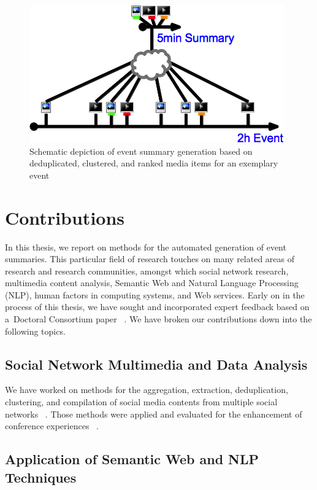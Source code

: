 \begin{figure}[!ht]
  \centering
  \includegraphics[]{thesis-diagram.png}
  \caption[Schematic depiction of event summary generation]
    {Schematic depiction of event summary generation
    based on deduplicated, clustered, and ranked media items
    for an exemplary event}
  \label{fig:thesis-diagram}
\end{figure}

\section{Contributions}

In this thesis, we report on methods for
the automated generation of event summaries.
This particular field of research touches on many related areas
of research and research communities,
amongst which social network research, multimedia content analysis,
Semantic Web and Natural Language Processing (NLP),
human factors in computing systems,
and Web services.
Early on in the process of this thesis,
we have sought and incorporated expert feedback based on
a~Doctoral Consortium paper~%
\cite{steiner2011enrichingunstructured}.
We have broken our contributions down into
the following topics.

\subsection{Social Network Multimedia and Data Analysis}

We have worked on methods for the aggregation, extraction,
deduplication, clustering, and compilation
of social media contents from
multiple social networks~%
\cite{rizzo2012whatfresh}.
Those methods were applied and evaluated
for the enhancement of conference experiences~%
\cite{khrouf2012aggregatingsocialmedia,khrouf2012confomaton}.

\subsection{Application of Semantic Web and NLP Techniques}

